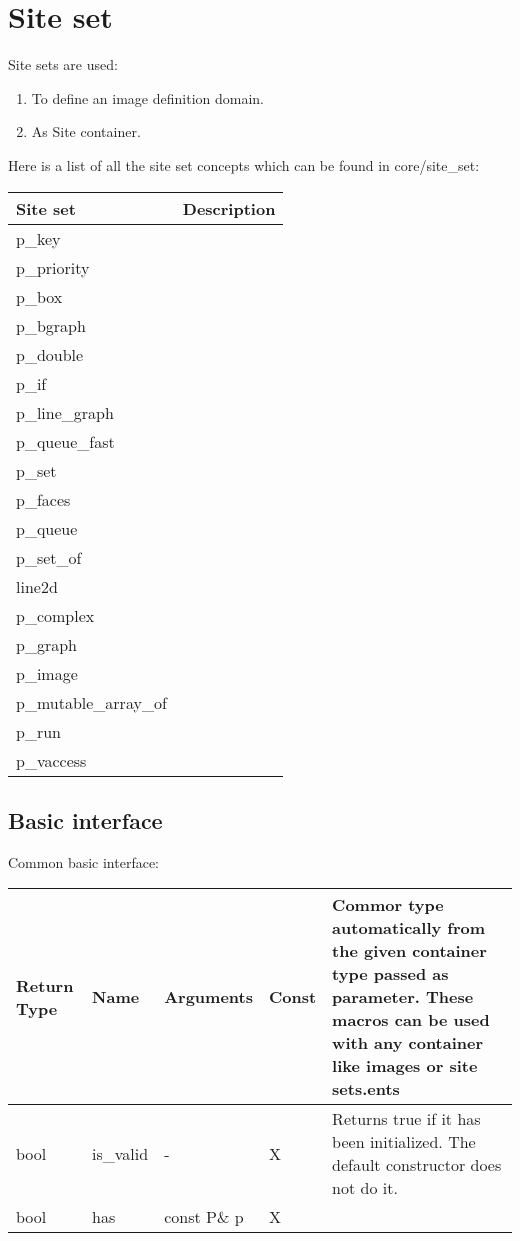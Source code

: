 \documentclass{report}
\begin{document}
\section{Site set}

Site sets are used:
\begin{enumerate}
  \item To define an image definition domain.
  \item As Site container.
\end{enumerate}

Here is a list of all the site set concepts which can be found in
core/site\_set:

\begin{tabular}{|l|p{8cm}|}
\hline
Site set & Description \\ \hline

p\_key & \\ \hline
p\_priority & \\ \hline
p\_box & \\ \hline
p\_bgraph & \\ \hline
p\_double & \\ \hline
p\_if & \\ \hline
p\_line\_graph & \\ \hline
p\_queue\_fast & \\ \hline
p\_set & \\ \hline
p\_faces & \\ \hline
p\_queue & \\ \hline
p\_set\_of & \\ \hline
line2d & \\ \hline
p\_complex & \\ \hline
p\_graph & \\ \hline
p\_image & \\ \hline
p\_mutable\_array\_of & \\ \hline
p\_run & \\ \hline
p\_vaccess & \\ \hline
\end{tabular}

\subsection{Basic interface}
Common basic interface:\\

\begin{tabular}{|l|l|l|l|p{4cm}|}
\hline
Return Type & Name & Arguments & Const & Commor type automatically from the
given container type
passed as parameter. These macros can be used with any container like images or
site sets.ents \\ \hline

bool & is\_valid & - & X & Returns true if it has been initialized. The
default constructor does not do it. \\ \hline

bool & has & const P\& p & X &  \\ \hline
\end{tabular} \\
\end{document}
